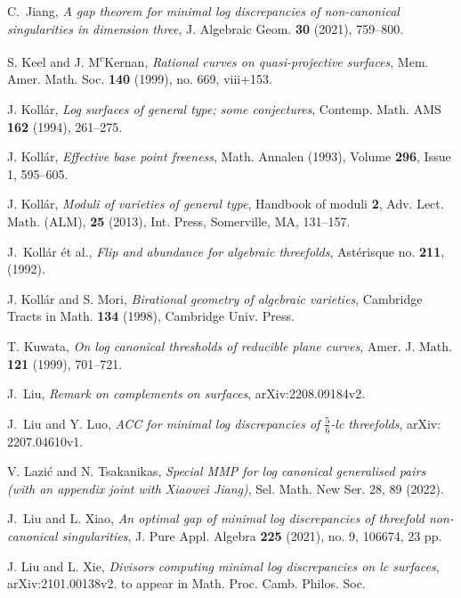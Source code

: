\documentclass[11pt]{amsart}
\numberwithin{equation}{section}
\theoremstyle{definition}
\theoremstyle{definition}
\theoremstyle{definition}
\begin{document}
\begin{thebibliography}{ABCDE}
 C.~Jiang, \textit{A gap theorem for minimal log discrepancies of non-canonical singularities in dimension three}, J. Algebraic Geom. \textbf{30} (2021), 759--800.

 S. Keel and J. M\textsuperscript{c}Kernan, \textit{Rational curves on quasi-projective surfaces}, Mem. Amer. Math. Soc. \textbf{140} (1999), no. 669, viii+153.

 J. Koll\'ar, \textit{Log surfaces of general type; some conjectures}, Contemp. Math. AMS \textbf{162} (1994), 261--275.



 J. Koll\'{a}r, \textit{Effective base point freeness}, Math. Annalen (1993), Volume \textbf{296}, Issue 1, 595--605.


 J. Koll\'ar, \textit{Moduli of varieties of general type}, Handbook of moduli \textbf{2}, Adv. Lect. Math. (ALM), \textbf{25} (2013), Int. Press, Somerville, MA, 131--157.

 J.~Koll\'{a}r \'{e}t al., \textit{Flip and abundance for algebraic threefolds}, Ast\'{e}risque no. \textbf{211}, (1992).

 J. Koll\'{a}r and S. Mori, \textit{Birational geometry of algebraic varieties}, Cambridge Tracts in Math. \textbf{134} (1998), Cambridge Univ. Press.

 T. Kuwata, \textit{On log canonical thresholds of reducible plane curves}, Amer. J. Math. \textbf{121} (1999), 701--721.

 J.~Liu, \textit{Remark on complements on surfaces}, arXiv:2208.09184v2. 

 J.~Liu and Y. Luo, \textit{ACC for minimal log discrepancies of $\frac{5}{6}$-lc threefolds}, arXiv: 2207.04610v1.

 V. Lazi\'c and N. Tsakanikas, \textit{Special MMP for log canonical generalised pairs (with an appendix joint with Xiaowei Jiang)},  Sel. Math. New Ser. 28, 89 (2022).


 J.~Liu and L. Xiao, \textit{An optimal gap of minimal log discrepancies of threefold non-canonical singularities}, J. Pure Appl. Algebra \textbf{225} (2021), no. 9, 106674, 23 pp.

 J. Liu and L. Xie, \textit{Divisors computing minimal log discrepancies on lc surfaces}, arXiv:2101.00138v2. to appear in Math. Proc. Camb. Philos. Soc.


\end{thebibliography}
\end{document}
